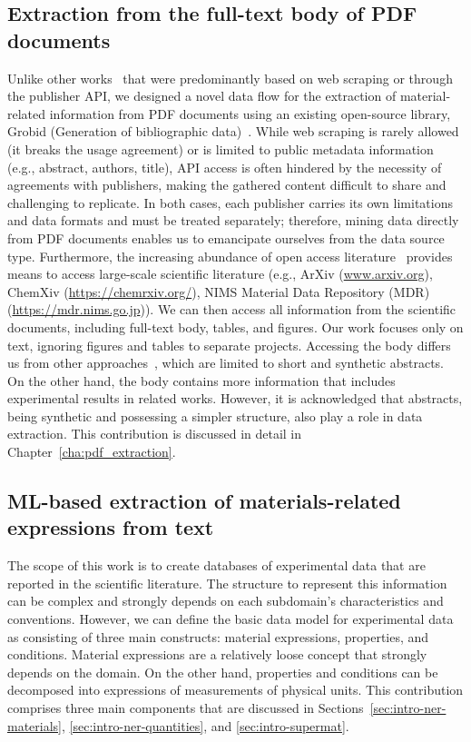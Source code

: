 \subsection{Extraction from the full-text body of PDF documents}
\label{sec:intro-pdf-contribution}

Unlike other works~\cite{court2018auto, court2020magnetic, kononova2019text} that were predominantly based on web scraping or through the publisher API, we designed a novel data flow for the extraction of material-related information from PDF documents using an existing open-source library, Grobid (Generation of bibliographic data)~\cite{Grobid}. 
While web scraping is rarely allowed (it breaks the usage agreement) or is limited to public metadata information (e.g., abstract, authors, title), API access is often hindered by the necessity of agreements with publishers, making the gathered content difficult to share and challenging to replicate.
In both cases, each publisher carries its own limitations and data formats and must be treated separately; therefore, mining data directly from PDF documents enables us to emancipate ourselves from the data source type.
Furthermore, the increasing abundance of open access literature~\cite{laakso2011the} provides means to access large-scale scientific literature (e.g., ArXiv (\url{www.arxiv.org}), ChemXiv (\url{https://chemrxiv.org/}), NIMS Material Data Repository (MDR)~\cite{tanifuji2019mdr} (\url{https://mdr.nims.go.jp})). 
We can then access all information from the scientific documents, including full-text body, tables, and figures. Our work focuses only on text, ignoring figures and tables to separate projects. 
Accessing the body differs us from other approaches~\cite{yamaguchi-etal-2020-sc}, which are limited to short and synthetic abstracts. On the other hand, the body contains more information that includes experimental results in related works. 
However, it is acknowledged that abstracts, being synthetic and possessing a simpler structure, also play a role in data extraction.
This contribution is discussed in detail in Chapter~\ref{cha:pdf_extraction}.

\subsection{ML-based extraction of materials-related expressions from text}
\label{sec:intro-material-related-extraction}

The scope of this work is to create databases of experimental data that are reported in the scientific literature. 
The structure to represent this information can be complex and strongly depends on each subdomain's characteristics and conventions. 
However, we can define the basic data model for experimental data as consisting of three main constructs: material expressions, properties, and conditions. 
Material expressions are a relatively loose concept that strongly depends on the domain. On the other hand, properties and conditions can be decomposed into expressions of measurements of physical units. 
This contribution comprises three main components that are discussed in Sections~\ref{sec:intro-ner-materials}, \ref{sec:intro-ner-quantities}, and \ref{sec:intro-supermat}.

